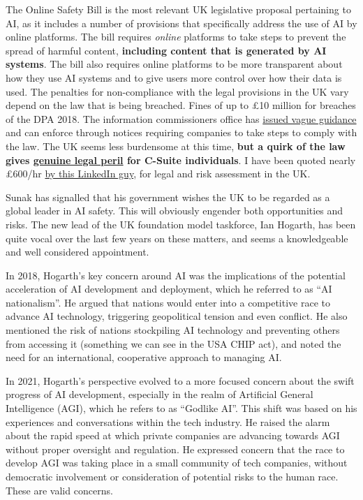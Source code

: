 The Online Safety Bill is the most relevant UK legislative proposal pertaining to AI, as it includes a number of provisions that specifically address the use of AI by online platforms. The bill requires \textit{online} platforms to take steps to prevent the spread of harmful content, \textbf{including content that is generated by AI systems}. The bill also requires online platforms to be more transparent about how they use AI systems and to give users more control over how their data is used. The penalties for non-compliance with the legal provisions in the UK vary depend on the law that is being breached. Fines of up to £10 million for breaches of the DPA 2018. The information commissioners office has \href{https://ico.org.uk/for-organisations/uk-gdpr-guidance-and-resources/artificial-intelligence/guidance-on-ai-and-data-protection/how-should-we-assess-security-and-data-minimisation-in-ai/}{issued vague guidance} and can enforce through notices requiring companies to take steps to comply with the law. The UK seems less burdensome at this time, \textbf{but a quirk of the law gives \href{https://webdevlaw.uk/2022/11/21/a-quick-hypothetical-situation-or-your-crash-introduction-to-the-real-world/}{genuine legal peril} for C-Suite individuals}. I have been quoted nearly £600/hr \href{https://www.linkedin.com/in/barry-scannell-bbb5aa207/}{by this LinkedIn guy}, for legal and risk assessment in the UK.\par
Sunak has signalled that his government wishes the UK to be regarded as a global leader in AI safety. This will obviously engender both opportunities and risks. The new lead of the UK foundation model taskforce, Ian Hogarth, has been quite vocal over the last few years on these matters, and seems a knowledgeable and well considered appointment.\par
In 2018, Hogarth's key concern around AI was the implications of the potential acceleration of AI development and deployment, which he referred to as ``AI nationalism''. He argued that nations would enter into a competitive race to advance AI technology, triggering geopolitical tension and even conflict. He also mentioned the risk of nations stockpiling AI technology and preventing others from accessing it (something we can see in the USA CHIP act), and noted the need for an international, cooperative approach to managing AI.\par
In 2021, Hogarth’s perspective evolved to a more focused concern about the swift progress of AI development, especially in the realm of Artificial General Intelligence (AGI), which he refers to as ``Godlike AI''. This shift was based on his experiences and conversations within the tech industry. He raised the alarm about the rapid speed at which private companies are advancing towards AGI without proper oversight and regulation.  He expressed concern that the race to develop AGI was taking place in a small community of tech companies, without democratic involvement or consideration of potential risks to the human race. These are valid concerns.\par
